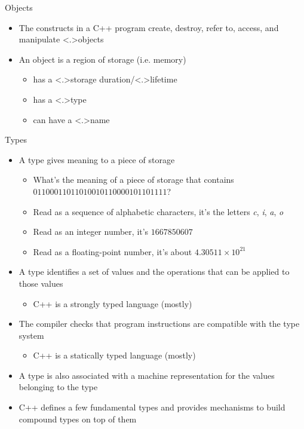 \begin{frame}{Objects}

  \begin{itemize}[<+->]
  \item The constructs in a C++ program create, destroy, refer to, access,
    and manipulate \alert<.>{objects}
  \item An object is a region of storage (i.e. memory)
    \begin{itemize}[<+->]
    \item has a \alert<.>{storage duration}/\alert<.>{lifetime}
    \item has a \alert<.>{type}
    \item can have a \alert<.>{name}
    \end{itemize}
  \end{itemize}

\end{frame}

\begin{frame}{Types}

  \begin{itemize}[<+->]
  \item A type gives meaning to a piece of storage
    \begin{itemize}
    \item What's the meaning of a piece of storage that contains $01100011011010010110000101101111$?
    \item Read as a sequence of alphabetic characters, it's the letters
      \textit{c}, \textit{i}, \textit{a}, \textit{o}
    \item Read as an integer number, it's $1667850607$
    \item Read as a floating-point number, it's about $4.30511 \times 10^{21}$
    \end{itemize}
  \item A type identifies a set of values and the operations that can be applied
    to those values
    \begin{itemize}
    \item C++ is a \alert{strongly typed} language (mostly)
    \end{itemize}
  \item The compiler checks that program instructions are compatible with the type system
    \begin{itemize}
    \item C++ is a \alert{statically typed} language (mostly)
    \end{itemize}
  \item A type is also associated with a machine representation for
    the values belonging to the type
  \item C++ defines a few fundamental types and provides mechanisms to build
    compound types on top of them
  \end{itemize}

\end{frame}

